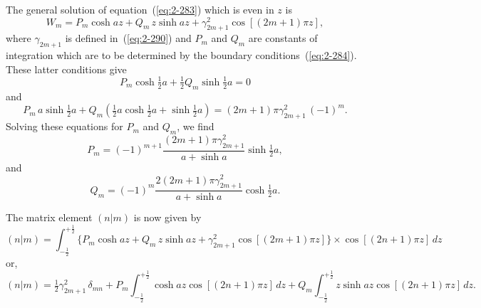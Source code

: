 The general solution of equation~(\ref{eq:2-283}) which is even in $z$ is
\begin{equation}
\label{eq:2-301}
W_m = P_m \cosh az + Q_m\,z\sinh az + \gamma_{2m+1}^2 \cos[(2m+1)\pi z],
\end{equation}
where $\gamma_{2m+1}$ is defined in~(\ref{eq:2-290}) and $P_m$ and $Q_m$ are constants of integration
which are to be determined by the boundary conditions~(\ref{eq:2-284}). These
latter conditions give
\begin{equation}
\label{eq:2-302}
P_m \cosh\tfrac{1}{2}a + \tfrac{1}{2}Q_m \sinh\tfrac{1}{2}a = 0
\end{equation}
and
\begin{equation}
P_m\,a\sinh\tfrac{1}{2}a + Q_m(\tfrac{1}{2}a\cosh\tfrac{1}{2}a + \sinh\tfrac{1}{2}a) = (2m+1)\pi\gamma_{2m+1}^2\,(-1)^m.
\end{equation}
Solving these equations for $P_m$ and $Q_m$, we find
\begin{equation}
\label{eq:2-303}
P_m = (-1)^{m+1}\frac{(2m+1)\pi\gamma_{2m+1}^2}{a + \sinh a}\sinh\tfrac{1}{2}a,
\end{equation}
and
\begin{equation}
Q_m = (-1)^m\frac{2(2m+1)\pi\gamma_{2m+1}^2}{a + \sinh a}\cosh\tfrac{1}{2}a.
\end{equation}

The matrix element $(n|m)$ is now given by
\begin{equation}
\label{eq:2-304}
(n|m) = \int_{-\frac{1}{2}}^{+\frac{1}{2}} \{P_m \cosh az + Q_m\,z\sinh az + \gamma_{2m+1}^2\cos[(2m+1)\pi z]\} \times \cos[(2n+1)\pi z]\,dz
\end{equation}
or,
\begin{equation}
\label{eq:2-305}
(n|m) = \tfrac{1}{2}\gamma_{2m+1}^2\,\delta_{mn} + P_m \int_{-\frac{1}{2}}^{+\frac{1}{2}} \cosh az\cos[(2n+1)\pi z]\,dz +
Q_m \int_{-\frac{1}{2}}^{+\frac{1}{2}} z\sinh az\cos[(2n+1)\pi z]\,dz.
\end{equation}

